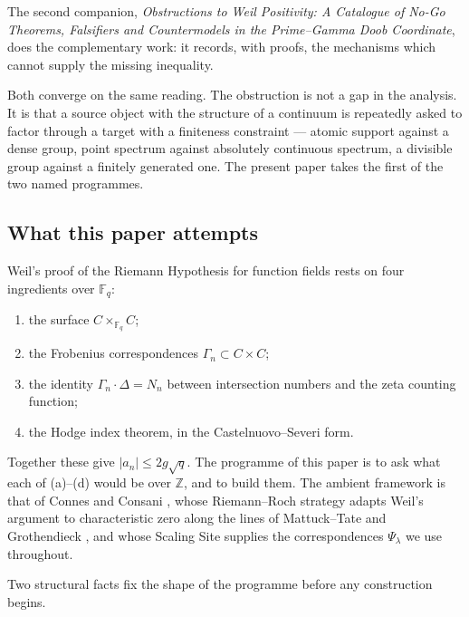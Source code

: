 \documentclass[11pt]{amsart}
\theoremstyle{definition}
\theoremstyle{remark}
\newcommand{\Z}{\mathbb Z}
\begin{document}
The second companion, \emph{Obstructions to Weil Positivity: A Catalogue of
No-Go Theorems, Falsifiers and Countermodels in the Prime--Gamma Doob
Coordinate}, does the complementary work: it records, with proofs, the
mechanisms which cannot supply the missing inequality.

Both converge on the same reading.  The obstruction is not a gap in the
analysis.  It is that a source object with the structure of a continuum is
repeatedly asked to factor through a target with a finiteness constraint ---
atomic support against a dense group, point spectrum against absolutely
continuous spectrum, a divisible group against a finitely generated one.
The present paper takes the first of the two named programmes.

\subsection{What this paper attempts}

Weil's proof of the Riemann Hypothesis for function fields
\cite{Weil1948,Weil1952} rests on four ingredients over $\mathbb F_q$:

\begin{enumerate}
\item[(a)] the surface $C\times_{\mathbb F_q}C$;
\item[(b)] the Frobenius correspondences $\Gamma_n\subset C\times C$;
\item[(c)] the identity $\Gamma_n\cdot\Delta=N_n$ between intersection
numbers and the zeta counting function;
\item[(d)] the Hodge index theorem, in the Castelnuovo--Severi form.
\end{enumerate}

Together these give $|a_n|\le 2g\sqrt q$.  The programme of this paper is to
ask what each of (a)--(d) would be over $\Z$, and to build them.  The
ambient framework is that of Connes and Consani
\cite{CC-ArithmeticSite,CC-ScalingSite,CC-RRstrategy,CC-RRSpecZ}, whose
Riemann--Roch strategy adapts Weil's argument to characteristic zero along
the lines of Mattuck--Tate and Grothendieck
\cite{MattuckTate,Grothendieck}, and whose Scaling Site supplies the
correspondences $\Psi_\lambda$ we use throughout.

Two structural facts fix the shape of the programme before any construction
begins.
\end{document}
